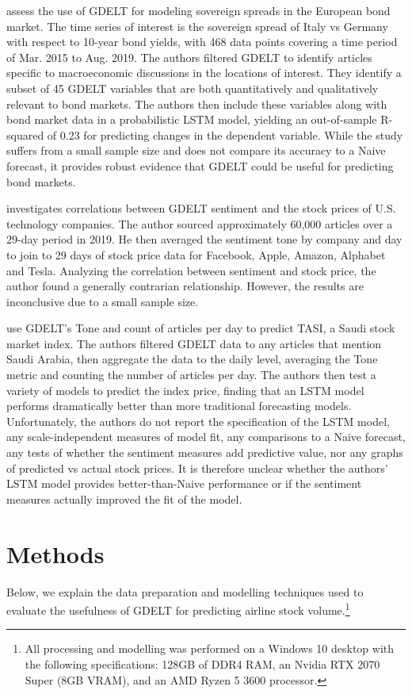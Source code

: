 \documentclass[12pt]{article}
\begin{document}
\textcite{consoli2021information} assess the use of GDELT for modeling sovereign spreads in the European bond market. The time series of interest is the sovereign spread of Italy vs Germany with respect to 10-year bond yields, with 468 data points covering a time period of Mar. 2015 to Aug. 2019. The authors filtered GDELT to identify articles specific to macroeconomic discussions in the locations of interest. They identify a subset of 45 GDELT variables that are both quantitatively and qualitatively relevant to bond markets. The authors then include these variables along with bond market data in a probabilistic LSTM model, yielding an out-of-sample R-squared of 0.23 for predicting changes in the dependent variable. While the study suffers from a small sample size and does not compare its accuracy to a Naive forecast, it provides robust evidence that GDELT could be useful for predicting bond markets.

\textcite{jakel2019using} investigates correlations between GDELT sentiment and the stock prices of U.S. technology companies. The author sourced approximately 60,000 articles over a 29-day period in 2019. He then averaged the sentiment tone by company and day to join to 29 days of stock price data for Facebook, Apple, Amazon, Alphabet and Tesla. Analyzing the correlation between sentiment and stock price, the author found a generally contrarian relationship. However, the results are inconclusive due to a small sample size.

\textcite{alamro2019predicting} use GDELT's Tone and count of articles per day to predict TASI, a Saudi stock market index. The authors filtered GDELT data to any articles that mention Saudi Arabia, then aggregate the data to the daily level, averaging the Tone metric and counting the number of articles per day. The authors then test a variety of models to predict the index price, finding that an LSTM model performs dramatically better than more traditional forecasting models. Unfortunately, the authors do not report the specification of the LSTM model, any scale-independent measures of model fit, any comparisons to a Naive forecast, any tests of whether the sentiment measures add predictive value, nor any graphs of predicted vs actual stock prices. It is therefore unclear whether the authors' LSTM model provides better-than-Naive performance or if the sentiment measures actually improved the fit of the model.

\section{Methods}
Below, we explain the data preparation and modelling techniques used to evaluate the usefulness of GDELT for predicting airline stock volume.\footnote{All processing and modelling was performed on a Windows 10 desktop with the following specifications: 128GB of DDR4 RAM, an Nvidia RTX 2070 Super (8GB VRAM), and an AMD Ryzen 5 3600 processor.}
\end{document}
